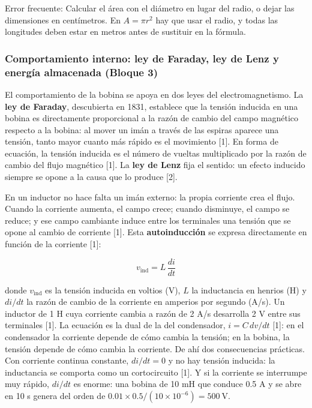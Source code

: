 \documentclass[11pt,letterpaper]{article}
\begin{document}
\begin{nota}{Error frecuente:}
Calcular el área con el diámetro en lugar del radio, o dejar las dimensiones en centímetros. En $A = \pi r^2$ hay que usar el radio, y todas las longitudes deben estar en metros antes de sustituir en la fórmula.
\end{nota}

\subsubsection{Comportamiento interno: ley de Faraday, ley de Lenz y energía almacenada (Bloque 3)}

El comportamiento de la bobina se apoya en dos leyes del electromagnetismo. La \textbf{ley de Faraday}, descubierta en 1831, establece que la tensión inducida en una bobina es directamente proporcional a la razón de cambio del campo magnético respecto a la bobina: al mover un imán a través de las espiras aparece una tensión, tanto mayor cuanto más rápido es el movimiento [1]. En forma de ecuación, la tensión inducida es el número de vueltas multiplicado por la razón de cambio del flujo magnético [1]. La \textbf{ley de Lenz} fija el sentido: un efecto inducido siempre se opone a la causa que lo produce [2].

En un inductor no hace falta un imán externo: la propia corriente crea el flujo. Cuando la corriente aumenta, el campo crece; cuando disminuye, el campo se reduce; y ese campo cambiante induce entre los terminales una tensión que se opone al cambio de corriente [1]. Esta \textbf{autoinducción} se expresa directamente en función de la corriente [1]:

\begin{equation}
  v_{\mathrm{ind}} = L\,\frac{di}{dt}
\end{equation}

donde $v_{\mathrm{ind}}$ es la tensión inducida en voltios (V), $L$ la inductancia en henrios (H) y $di/dt$ la razón de cambio de la corriente en amperios por segundo (A/s). Un inductor de 1 H cuya corriente cambia a razón de 2 A/s desarrolla 2 V entre sus terminales [1]. La ecuación es la dual de la del condensador, $i = C\,dv/dt$ [1]: en el condensador la corriente depende de cómo cambia la tensión; en la bobina, la tensión depende de cómo cambia la corriente. De ahí dos consecuencias prácticas. Con corriente continua constante, $di/dt = 0$ y no hay tensión inducida: la inductancia se comporta como un cortocircuito [1]. Y si la corriente se interrumpe muy rápido, $di/dt$ es enorme: una bobina de 10 mH que conduce 0.5 A y se abre en 10 \textmu{}s genera del orden de $0.01 \times 0.5 / (10 \times 10^{-6}) = 500\ \text{V}$.
\end{document}
